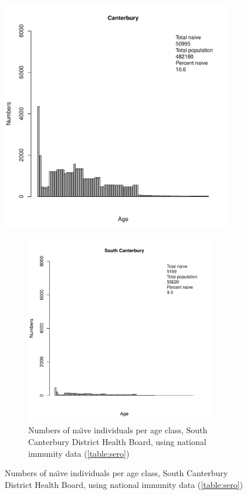 \documentclass{article}
\begin{document}
\begin{figure}[H]
   \begin{center}
     \includegraphics[width=0.9\textwidth]{dhb18.pdf}
     \end{center}
     \caption{Numbers of na\"{\i}ve individuals per age class, Canterbury District Health Board, using national immunity data (\autoref{table:sero})}
     \label{fig:Canterbury}

\begin{figure}[H]
     \begin{center}
     \includegraphics[width=0.9\textwidth]{dhb19.pdf}
     \end{center}
     \caption{Numbers of na\"{\i}ve individuals per age class, South Canterbury District Health Board, using national immunity data (\autoref{table:sero})}
     \label{fig:SouthCanterbury}
\end{figure}


\end{figure}
\end{document}

